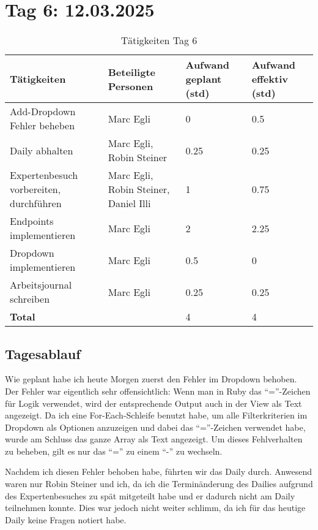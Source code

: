 \section{Tag 6: 12.03.2025}
\begin{table}[H]
    \begin{tabular}{|L{0.4\textwidth}|C{60pt}|C{60pt}|C{60pt}|}
        \hline
        \color{white}Tätigkeiten & \color{white}Beteiligte \color{white}Personen & \color{white}Aufwand geplant (std) & \color{white}Aufwand effektiv (std) \\
        \hline
         Add-Dropdown Fehler beheben & Marc Egli & 0 & 0.5 \\
        \hline
        Daily abhalten & Marc Egli, Robin Steiner & 0.25 & 0.25 \\
        \hline
        Expertenbesuch vorbereiten, durchführen & Marc Egli, Robin Steiner, Daniel Illi & 1 & 0.75 \\
        \hline
        Endpoints implementieren & Marc Egli & 2 & 2.25 \\
        \hline
        Dropdown implementieren & Marc Egli & 0.5 & 0 \\
        \hline
        Arbeitsjournal schreiben & Marc Egli & 0.25 & 0.25 \\
        \textbf{Total} &  & 4 & 4 \\
        \hline
    \end{tabular}
    \caption{Tätigkeiten Tag 6}
\end{table}

\subsection*{Tagesablauf}
Wie geplant habe ich heute Morgen zuerst den Fehler im Dropdown behoben. Der Fehler war eigentlich sehr offensichtlich: Wenn man in Ruby das ``=''-Zeichen 
für Logik verwendet, wird der entsprechende Output auch in der View als Text angezeigt. Da ich eine For-Each-Schleife benutzt habe, um alle Filterkriterien im Dropdown
als Optionen anzuzeigen und dabei das ``=''-Zeichen verwendet habe, wurde am Schluss das ganze Array als Text angezeigt. Um dieses Fehlverhalten zu beheben, gilt es nur das ``='' zu einem 
``-'' zu wechseln. 

Nachdem ich diesen Fehler behoben habe, führten wir das Daily durch. Anwesend waren nur Robin Steiner und ich, da ich die Terminänderung des Dailies aufgrund des Expertenbesuches zu spät
mitgeteilt habe und er dadurch nicht am Daily teilnehmen konnte. Dies war jedoch nicht weiter schlimm, da ich für das heutige Daily keine Fragen notiert habe.

